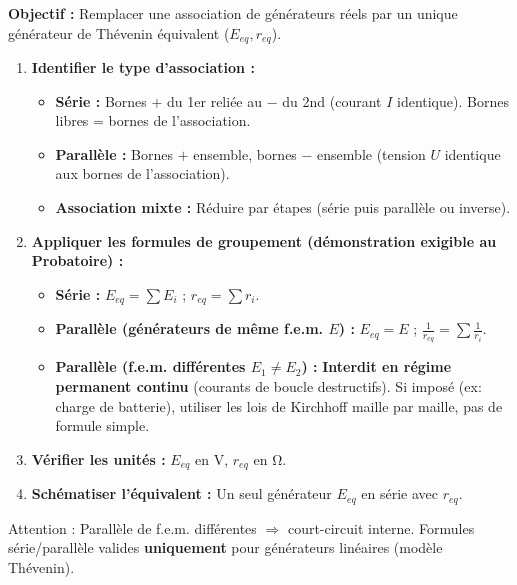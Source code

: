 \documentclass[11pt]{article}
\newcommand{\cle}[1]{{\popxbold\color{popdark}#1}}
\begin{document}
\begin{methode}
\textbf{Objectif :} Remplacer une association de générateurs réels par un unique générateur de Thévenin équivalent ($E_{eq}, r_{eq}$).
\begin{enumerate}
    \item \textbf{Identifier le type d'association :}
        \begin{itemize}
            \item \textbf{Série :} Bornes $+$ du 1er reliée au $-$ du 2nd (courant $I$ identique). Bornes libres = bornes de l'association.
            \item \textbf{Parallèle :} Bornes $+$ ensemble, bornes $-$ ensemble (tension $U$ identique aux bornes de l'association).
            \item \textbf{Association mixte :} Réduire par étapes (série puis parallèle ou inverse).
        \end{itemize}
    \item \textbf{Appliquer les formules de groupement (démonstration exigible au Probatoire) :}
        \begin{itemize}
            \item \textbf{Série :} $E_{eq} = \sum E_i$ ; $r_{eq} = \sum r_i$.
            \item \textbf{Parallèle (générateurs de même f.e.m. $E$) :} $E_{eq} = E$ ; $\frac{1}{r_{eq}} = \sum \frac{1}{r_i}$.
            \item \textbf{Parallèle (f.e.m. différentes $E_1 \neq E_2$) :} \textbf{Interdit en régime permanent continu} (courants de boucle destructifs). Si imposé (ex: charge de batterie), utiliser les lois de Kirchhoff maille par maille, pas de formule simple.
        \end{itemize}
    \item \textbf{Vérifier les unités :} $E_{eq}$ en \si{V}, $r_{eq}$ en \si{\ohm}.
    \item \textbf{Schématiser l'équivalent :} Un seul générateur $E_{eq}$ en série avec $r_{eq}$.
\end{enumerate}
\cle{Attention} : Parallèle de f.e.m. différentes $\Rightarrow$ court-circuit interne. Formules série/parallèle valides \textbf{uniquement} pour générateurs linéaires (modèle Thévenin).
\end{methode}
\end{document}
